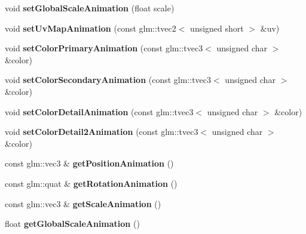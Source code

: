 \begin{DoxyCompactItemize}
void {\bfseries set\+Global\+Scale\+Animation} (float scale)
\item 
\mbox{\label{classTarbora_1_1AnimatedNode_a6b32e3442bbbd370d73cc61ac6e80514}} 
void {\bfseries set\+Uv\+Map\+Animation} (const glm\+::tvec2$<$ unsigned short $>$ \&uv)
\item 
\mbox{\label{classTarbora_1_1AnimatedNode_a25054223d38704d2671a9f5214f94702}} 
void {\bfseries set\+Color\+Primary\+Animation} (const glm\+::tvec3$<$ unsigned char $>$ \&color)
\item 
\mbox{\label{classTarbora_1_1AnimatedNode_abc723035daccf254fa2e4e590ab8625c}} 
void {\bfseries set\+Color\+Secondary\+Animation} (const glm\+::tvec3$<$ unsigned char $>$ \&color)
\item 
\mbox{\label{classTarbora_1_1AnimatedNode_a606f8d404bd97a8524e3bd52434b9686}} 
void {\bfseries set\+Color\+Detail\+Animation} (const glm\+::tvec3$<$ unsigned char $>$ \&color)
\item 
\mbox{\label{classTarbora_1_1AnimatedNode_a7a36adb6aecddf443a8d91f64b42d16a}} 
void {\bfseries set\+Color\+Detail2\+Animation} (const glm\+::tvec3$<$ unsigned char $>$ \&color)
\item 
\mbox{\label{classTarbora_1_1AnimatedNode_a3992e83c9d856be4312c2a82818202f7}} 
const glm\+::vec3 \& {\bfseries get\+Position\+Animation} ()
\item 
\mbox{\label{classTarbora_1_1AnimatedNode_a60ed996f8227702ccc8afaf470629f54}} 
const glm\+::quat \& {\bfseries get\+Rotation\+Animation} ()
\item 
\mbox{\label{classTarbora_1_1AnimatedNode_a381ebd9c6caadd103e839b3faf6489ba}} 
const glm\+::vec3 \& {\bfseries get\+Scale\+Animation} ()
\item 
\mbox{\label{classTarbora_1_1AnimatedNode_a0fddc54e94bf50c435305043dc328ddc}} 
float {\bfseries get\+Global\+Scale\+Animation} ()
\item 

\end{DoxyCompactItemize}

